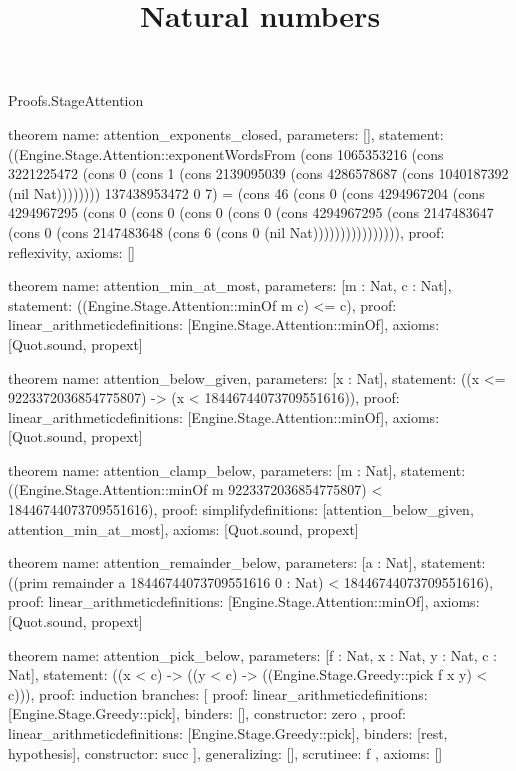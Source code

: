 \begin{lexlean}{Proofs.StageAttention}
\title{Natural numbers}
\begin{semanticmodule}
theorem{
  name: attention_exponents_closed,
  parameters: [],
  statement: ((Engine.Stage.Attention::exponentWordsFrom (cons 1065353216 (cons 3221225472 (cons 0 (cons 1 (cons 2139095039 (cons 4286578687 (cons 1040187392 (nil Nat)))))))) 137438953472 0 7) = (cons 46 (cons 0 (cons 4294967204 (cons 4294967295 (cons 0 (cons 0 (cons 0 (cons 0 (cons 4294967295 (cons 2147483647 (cons 0 (cons 2147483648 (cons 6 (cons 0 (nil Nat)))))))))))))))),
  proof: reflexivity{},
  axioms: []
}

theorem{
  name: attention_min_at_most,
  parameters: [m : Nat, c : Nat],
  statement: ((Engine.Stage.Attention::minOf m c) <= c),
  proof: linear_arithmetic{definitions: [Engine.Stage.Attention::minOf]},
  axioms: [Quot.sound, propext]
}

theorem{
  name: attention_below_given,
  parameters: [x : Nat],
  statement: ((x <= 9223372036854775807) -> (x < 18446744073709551616)),
  proof: linear_arithmetic{definitions: [Engine.Stage.Attention::minOf]},
  axioms: [Quot.sound, propext]
}

theorem{
  name: attention_clamp_below,
  parameters: [m : Nat],
  statement: ((Engine.Stage.Attention::minOf m 9223372036854775807) < 18446744073709551616),
  proof: simplify{definitions: [attention_below_given, attention_min_at_most]},
  axioms: [Quot.sound, propext]
}

theorem{
  name: attention_remainder_below,
  parameters: [a : Nat],
  statement: ((prim remainder a 18446744073709551616 0 : Nat) < 18446744073709551616),
  proof: linear_arithmetic{definitions: [Engine.Stage.Attention::minOf]},
  axioms: [Quot.sound, propext]
}

theorem{
  name: attention_pick_below,
  parameters: [f : Nat, x : Nat, y : Nat, c : Nat],
  statement: ((x < c) -> ((y < c) -> ((Engine.Stage.Greedy::pick f x y) < c))),
  proof: induction{
    branches: [
      {
        proof: linear_arithmetic{definitions: [Engine.Stage.Greedy::pick]},
        binders: [],
        constructor: zero
      },
      {
        proof: linear_arithmetic{definitions: [Engine.Stage.Greedy::pick]},
        binders: [rest, hypothesis],
        constructor: succ
      }
    ],
    generalizing: [],
    scrutinee: f
  },
  axioms: []
}


\end{semanticmodule}
\end{lexlean}

